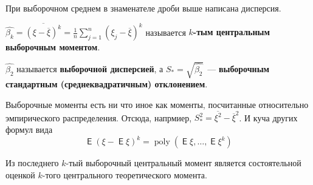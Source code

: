 \documentclass{article}
\DeclareMathOperator{\Expected}{\mathsf{E}}
\begin{document}
    \begin{remark}
        При выборочном среднем в знаменателе дроби выше написана дисперсия.
    \end{remark}
    \begin{definition}
        $\widehat{\beta_k}=\overline{(\xi-\overline{\xi})^k}=\frac1n\sum\limits_{j=1}^n(\xi_j-\overline\xi)^k$ называется \textbf{$k$-тым центральным выборочным моментом}.
    \end{definition}
    \begin{definition}
        $\widehat{\beta_2}$ называется \textbf{выборочной дисперсией}, а $S_*=\sqrt{\widehat{\beta_2}}$~--- \textbf{выборочным стандартным (среднеквадратичным) отклонением}.
    \end{definition}
    \begin{remark}
        Выборочные моменты есть ни что иное как моменты, посчитанные относительно эмпирического распределения. Отсюда, напрмиер, $S^2_*=\overline{\xi^2}-\overline{\xi}^2$. И куча других формул вида
        \[
        \Expected(\xi-\Expected\xi)^k=\operatorname{poly}(\Expected\xi,\ldots,\Expected\xi^k)
        \]
    \end{remark}
    \begin{claim}
        Из последнего $k$-тый выборочный центральный момент является состоятельной оценкой $k$-того центрального теоретического момента.
    \end{claim}
\end{document}
